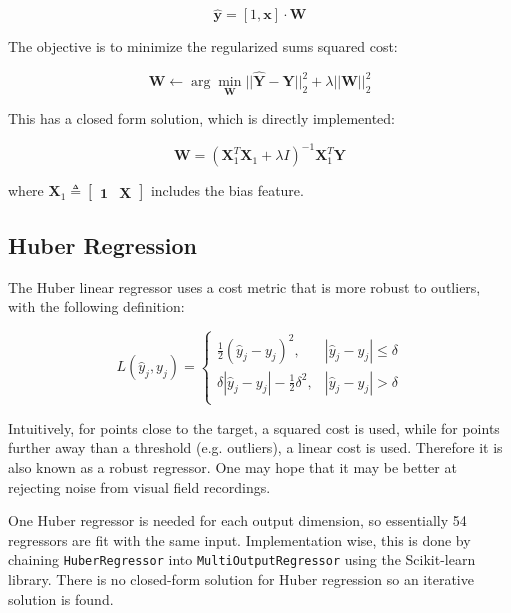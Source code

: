 \begin{equation}
\hat{\mathbf{y}} = [1, \mathbf{x}] \cdot \mathbf{W}
\end{equation}

The objective is to minimize the regularized sums squared cost:

\begin{equation}
\mathbf{W} \leftarrow \arg \min_{\mathbf{W}} ||\hat{\mathbf{Y}} - \mathbf{Y}||^2_2 + \lambda ||\mathbf{W}||^2_2
\end{equation}

This has a closed form solution, which is directly implemented:

\begin{equation}
\mathbf{W} = \left(
\mathbf{X}_1^T \mathbf{X}_1 + \lambda I
\right)^{-1}
\mathbf{X}_1^T \mathbf{Y}
\end{equation}

where $\mathbf{X}_1\triangleq\begin{bmatrix}\mathbf{1} & \mathbf{X} \end{bmatrix}$ includes the bias feature. 

\subsection{Huber Regression}

The Huber linear regressor uses a cost metric that is more robust to outliers, with the following definition:

\begin{equation}
L(\hat{y}_j, y_j) = \left\{\begin{array}{lr}
\frac{1}{2}(\hat{y}_j - y_j)^2, & |\hat{y}_j - y_j| \leq \delta\\
\delta|\hat{y}_j - y_j| - \frac{1}{2} \delta^2, & |\hat{y}_j - y_j| > \delta\\
\end{array}
\right.
\end{equation}

Intuitively, for points close to the target, a squared cost is used, while for points further away than a threshold (e.g. outliers), a linear cost is used. Therefore it is also known as a robust regressor. One may hope that it may be better at rejecting noise from visual field recordings. 

One Huber regressor is needed for each output dimension, so essentially 54 regressors are fit with the same input. Implementation wise, this is done by chaining \verb|HuberRegressor| into \verb|MultiOutputRegressor| using the Scikit-learn library. \cite{scikit-learn} There is no closed-form solution for Huber regression so an iterative solution is found. 

